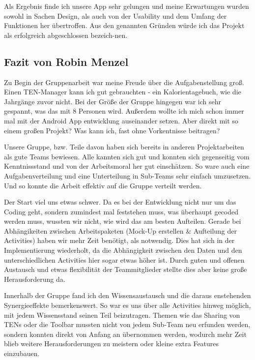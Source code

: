 Als Ergebnis finde ich unsere App sehr gelungen und meine Erwartungen wurden sowohl in Sachen Design, als auch von der Usability und dem Umfang der Funktionen her übertroffen. Aus den genannten Gründen würde ich das Projekt als erfolgreich abgeschlossen bezeich-nen.

\subsection{Fazit von Robin Menzel}

Zu Begin der Gruppenarbeit war meine Freude über die Aufgabenstellung groß. Einen TEN-Manager kann ich gut gebrauchten - ein Kalorientagebuch, wie die Jahrgänge zuvor nicht. Bei der Größe der Gruppe hingegen war ich sehr gespannt, was das mit 8 Personen wird. Außerdem wollte ich mich schon immer mal mit der Android App entwicklung auseinander setzen. Aber direkt mit so einem großen Projekt? Was kann ich, fast ohne Vorkentnisse beitragen?

Unsere Gruppe, bzw. Teile davon haben sich bereits in anderen Projektarbeiten als gute Teams bewiesen. Alle kannten sich gut und konnten sich gegenseitig vom Kenntnissstand und von der Arbeitsmoral her gut einschätzen. So ware auch eine Aufgabenverteilung und eine Unterteilung in Sub-Teams sehr einfach umzusetzen. Und so konnte die Arbeit effektiv auf die Gruppe verteilt werden.

Der Start viel uns etwas schwer. Da es bei der Entwicklung nicht nur um das Coding geht, sondern zumindest mal feststehen muss, was überhaupt gecoded werden muss, wussten wir nicht, wie wird das am besten Aufteilen. Gerade bei Abhängikeiten zwischen Arbeitspaketen (Mock-Up erstellen \& Aufteilung der Activities) haben wir mehr Zeit benötigt, als notwendig. Dies hat sich in der Implementierung wiederholt, da die Abhängigkeit zwischen den Daten und den unterschiedlichen Activities hier sogar etwas höher ist. Durch guten und offenen Austausch und etwas flexibilität der Teammitglieder stellte dies aber keine große Herausforderung da.

Innerhalb der Gruppe fand ich den Wissensaustausch und die daraus enstehenden Synergieeffekte bemerkenswert. So war es uns über alle Activities hinweg möglich, mit jedem Wissensstand seinen Teil beizutragen. Themen wie das Sharing von TENs oder die Toolbar mussten nicht von jedem Sub-Team neu erfunden werden, sondern konnten direkt von Anfang an übernommen werden, wodurch mehr Zeit blieb weitere Herausforderungen zu meistern oder kleine extra Features einzubauen.

